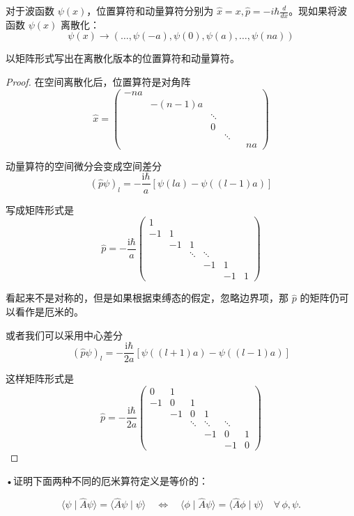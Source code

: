 \begin{7}
对于波函数 $\psi(x)$，位置算符和动量算符分别为 $\hat{x}=x, \hat{p}=-i \hbar \frac{d}{d x}$。现如果将波函数 $\psi(x)$ 离散化：
$$\psi(x) \rightarrow(\ldots, \psi(-a), \psi(0), \psi(a), \ldots, \psi(na))$$

以矩阵形式写出在离散化版本的位置算符和动量算符。
\end{7}
\begin{proof}
在空间离散化后，位置算符是对角阵
$$\hat{x}=\begin{pmatrix}
-n a & & & & & \\
& -(n-1) a & & & & \\
& & \ddots & & & \\
& & 0 & & \\
& & & \ddots & \\
& & & & & n a
\end{pmatrix}$$

动量算符的空间微分会变成空间差分
$$(\hat{p} \psi)_{l}=-\frac{\mathrm{i} \hbar}{a}[\psi(l a)-\psi((l-1) a)]$$

写成矩阵形式是
$$\hat{p}=-\frac{\mathrm{i} \hbar}{a}\begin{pmatrix}
1 & & & & & \\
-1 & 1 & & & & \\
& -1 & 1 & & & \\
& & \ddots & \ddots & & \\
& & & -1 & 1 & \\
& & & & -1 & 1
\end{pmatrix}$$

看起来不是对称的，但是如果根据束缚态的假定，忽略边界项，那 $\hat{p}$ 的矩阵仍可以看作是厄米的。

或者我们可以采用中心差分
$$(\hat{p} \psi)_{l}=-\frac{\mathrm{i} \hbar}{2a}[\psi((l+1)a)-\psi((l-1)a)]$$

这样矩阵形式是
$$\hat{p}=-\frac{\mathrm{i} \hbar}{2a}\begin{pmatrix}
0 & 1 & & & & \\
-1 & 0 & 1 & & & \\
& -1 & 0 & 1 & & \\
& & \ddots & \ddots & \ddots & \\
& & & -1 & 0 & 1 \\
& & & & -1 & 0
\end{pmatrix}$$

\end{proof}
\begin{8}
•证明下面两种不同的厄米算符定义是等价的：

\[\langle\psi \mid \hat{A} \psi\rangle=\langle\hat{A} \psi \mid \psi\rangle \quad 
\Leftrightarrow \quad\langle\phi \mid \hat{A} \psi\rangle
=\langle\hat{A} \phi \mid \psi\rangle \quad \forall\, \phi, \psi.\]

\end{8}
